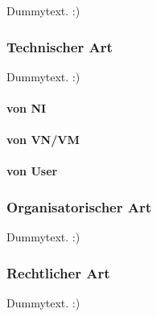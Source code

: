 Dummytext. :)


\subsubsection*{Technischer Art}
\label{subsubsec:gefahren_virt_technisch}
Dummytext. :)

\paragraph{von NI}
\label{parag:vonNI}

\paragraph{von VN/VM}
\label{parag:vonVN}

\paragraph{von User}
\label{parag:vonUser}


\subsubsection*{Organisatorischer Art}
\label{subsubsec:gefahren_virt_organisatorisch}
Dummytext. :)

\subsubsection*{Rechtlicher Art}
\label{subsubsec:gefahren_virt_rechtlich}
Dummytext. :)

